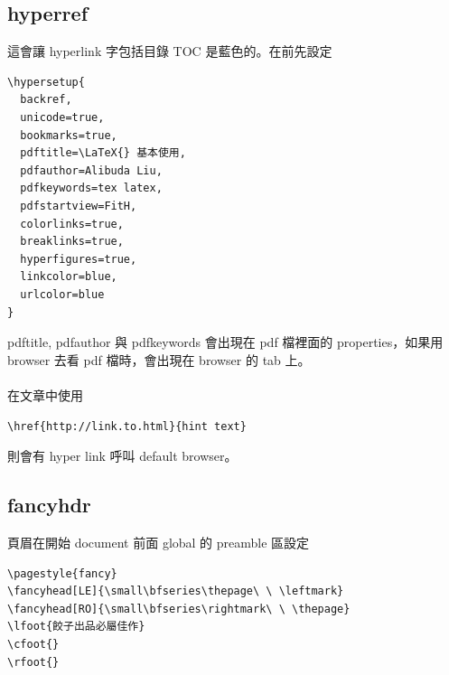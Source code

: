   \subsection{hyperref}
  這會讓 hyperlink 字包括目錄 TOC 是藍色的。在\verb==前先設定
  \begin{verbatim}
\hypersetup{
  backref,
  unicode=true,
  bookmarks=true,
  pdftitle=\LaTeX{} 基本使用,
  pdfauthor=Alibuda Liu,
  pdfkeywords=tex latex,
  pdfstartview=FitH,
  colorlinks=true,
  breaklinks=true,
  hyperfigures=true,
  linkcolor=blue,
  urlcolor=blue
}
  \end{verbatim}
  pdftitle, pdfauthor 與 pdfkeywords 會出現在 pdf 檔裡面的 properties，如果用
  browser 去看 pdf 檔時，會出現在 browser 的 tab 上。
  \\\\
  在文章中使用
  \begin{verbatim}
\href{http://link.to.html}{hint text}
  \end{verbatim}
  則會有 hyper link 呼叫 default browser。

  \subsection{fancyhdr}
  頁眉在開始 document 前面 global 的 preamble 區設定
  \begin{verbatim}
\pagestyle{fancy}
\fancyhead[LE]{\small\bfseries\thepage\ \ \leftmark}
\fancyhead[RO]{\small\bfseries\rightmark\ \ \thepage}
\lfoot{餃子出品必屬佳作}
\cfoot{}
\rfoot{}
  \end{verbatim}

